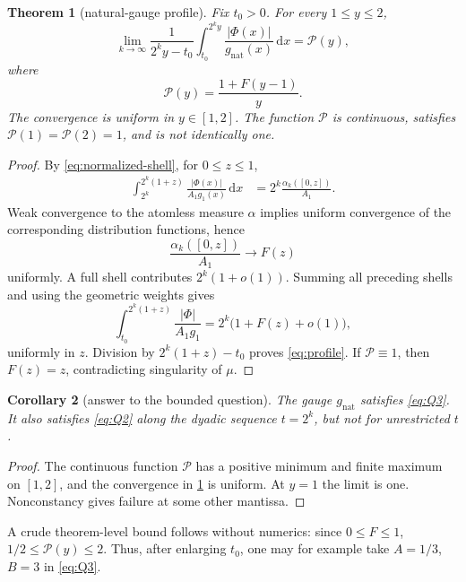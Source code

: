 \documentclass[11pt,oneside]{article}
\newtheorem{theorem}{Theorem}[section]
\newtheorem{corollary}[theorem]{Corollary}
\theoremstyle{definition}
\theoremstyle{remark}
\newcommand{\dd}{\,\mathrm d}
\begin{document}
\begin{theorem}[natural-gauge profile]
\label{thm:profile}
Fix \(t_0>0\).  For every \(1\le y\le2\),
\begin{equation}
 \lim_{k\to\infty}
 \frac1{2^ky-t_0}\int_{t_0}^{2^ky}
 \frac{|\Phi(x)|}{g_{\mathrm{nat}}(x)}\dd x
 =\mathscr P(y),
 \label{eq:profile-limit}
\end{equation}
where
\begin{equation}
 \boxed{
 \mathscr P(y)=\frac{1+F(y-1)}{y}.}
 \label{eq:profile}
\end{equation}
The convergence is uniform in \(y\in[1,2]\).  The function \(\mathscr P\)
is continuous, satisfies \(\mathscr P(1)=\mathscr P(2)=1\), and is not
identically one.
\end{theorem}

\begin{proof}
By \eqref{eq:normalized-shell}, for \(0\le z\le1\),
\begin{align}
 \int_{2^k}^{2^k(1+z)}\frac{|\Phi(x)|}{A_1g_1(x)}\dd x
 &=2^k\frac{\alpha_k([0,z])}{A_1}.
 \label{eq:partial-shell}
\end{align}
Weak convergence to the atomless measure \(\alpha\) implies uniform
convergence of the corresponding distribution functions, hence
\[
 \frac{\alpha_k([0,z])}{A_1}\longrightarrow F(z)
\]
uniformly.  A full shell contributes \(2^k(1+o(1))\).  Summing all preceding
shells and using the geometric weights gives
\[
 \int_{t_0}^{2^k(1+z)}\frac{|\Phi|}{A_1g_1}
 =2^k\bigl(1+F(z)+o(1)\bigr),
\]
uniformly in \(z\).  Division by \(2^k(1+z)-t_0\) proves
\eqref{eq:profile}.  If \(\mathscr P\equiv1\), then
\(F(z)=z\), contradicting singularity of \(\mu\).
\end{proof}

\begin{corollary}[answer to the bounded question]
\label{cor:Q3}
The gauge \(g_{\mathrm{nat}}\) satisfies \eqref{eq:Q3}.  It also satisfies
\eqref{eq:Q2} along the dyadic sequence \(t=2^k\), but not for unrestricted
\(t\).
\end{corollary}

\begin{proof}
The continuous function \(\mathscr P\) has a positive minimum and finite
maximum on \([1,2]\), and the convergence in \cref{thm:profile} is uniform.
At \(y=1\) the limit is one.  Nonconstancy gives failure at some other
mantissa.
\end{proof}

A crude theorem-level bound follows without numerics: since \(0\le F\le1\),
\(1/2\le\mathscr P(y)\le2\).  Thus, after enlarging \(t_0\), one may for
example take \(A=1/3\), \(B=3\) in \eqref{eq:Q3}.
\end{document}
